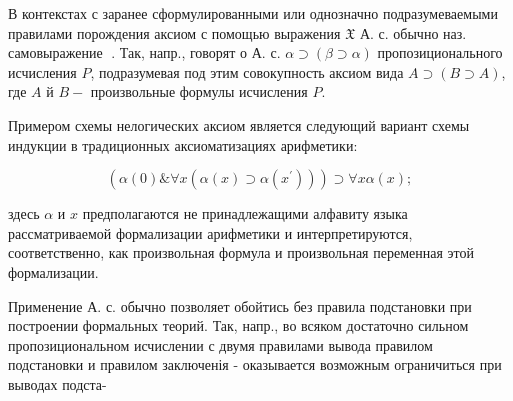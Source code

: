 \documentclass[10pt]{article}
\begin{document}
В контекстах с заранее сформулированными или однозначно подразумеваемыми правилами порождения аксиом с помощью выражения $\mathfrak{X}$ А. с. обычно наз. самовыражение গُ. Так, напр., говорят о А. с. $\alpha \supset(\beta \supset \alpha)$ пропозиционального исчисления $P$, подразумевая под этим совокупность аксиом вида $A \supset(B \supset A)$, где $A$ й $B-$ произвольные формулы исчисления $P$.



Примером схемы нелогических аксиом является следующий вариант схемы индукции в традиционных аксиоматизациях арифметики:



\[

\left(\alpha(0) \& \forall x\left(\alpha(x) \supset \alpha\left(x^{\prime}\right)\right)\right) \supset \forall x \alpha(x) ;

\]



здесь $\alpha$ и $x$ предполагаются не принадлежащими алфавиту языка рассматриваемой формализации арифметики и интерпретируются, соответственно, как произвольная формула и произвольная переменная этой формализации.



Применение А. с. обычно позволяет обойтись без правила подстановки при построении формальных теорий. Так, напр., во всяком достаточно сильном пропозициональном исчислении с двумя правилами вывода правилом подстановки и правилом заключенія - оказывается возможным ограничиться при выводах подста-
\end{document}
